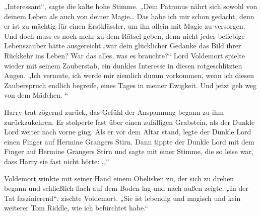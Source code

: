 „Interessant“, sagte die kalte hohe Stimme. „Dein Patronus nährt sich sowohl von deinem Leben als auch von deiner Magie… Das habe ich mir schon gedacht, denn er ist zu mächtig für einen Erstklässler, um ihn allein mit Magie zu versorgen. Und doch muss es noch mehr zu dem Rätsel geben, denn nicht jeder beliebige Lebenszauber hätte ausgereicht…war dein glücklicher Gedanke das Bild ihrer Rückkehr ins Leben? War das alles, was es brauchte?“
Lord Voldemort spielte wieder mit seinem Zauberstab, ein dunkles Interesse in diesen rotgeschlitzten Augen.
„Ich vermute, ich werde mir ziemlich dumm vorkommen, wenn ich diesen Zauberspruch endlich begreife, eines Tages in meiner Ewigkeit. Und jetzt geh weg von dem Mädchen. “

Harry trat zögernd zurück, das Gefühl der Anspannung begann zu ihm zurückzukehren. Er stolperte fast über einen zufälligen Grabstein, als der Dunkle Lord weiter nach vorne ging.
Als er vor dem Altar stand, legte der Dunkle Lord einen Finger auf Hermine Grangers Stirn.
Dann tippte der Dunkle Lord mit dem Finger auf Hermine Grangers Stirn und sagte mit einer Stimme, die so leise war, dass Harry sie fast nicht hörte: „.“

Voldemort winkte mit seiner Hand einem Obelisken zu, der sich zu drehen begann und schließlich flach auf dem Boden lag und nach außen zeigte.
„In der Tat faszinierend“, zischte Voldemort. „Sie ist lebendig und magisch und kein weiterer Tom Riddle, wie ich befürchtet habe.“

